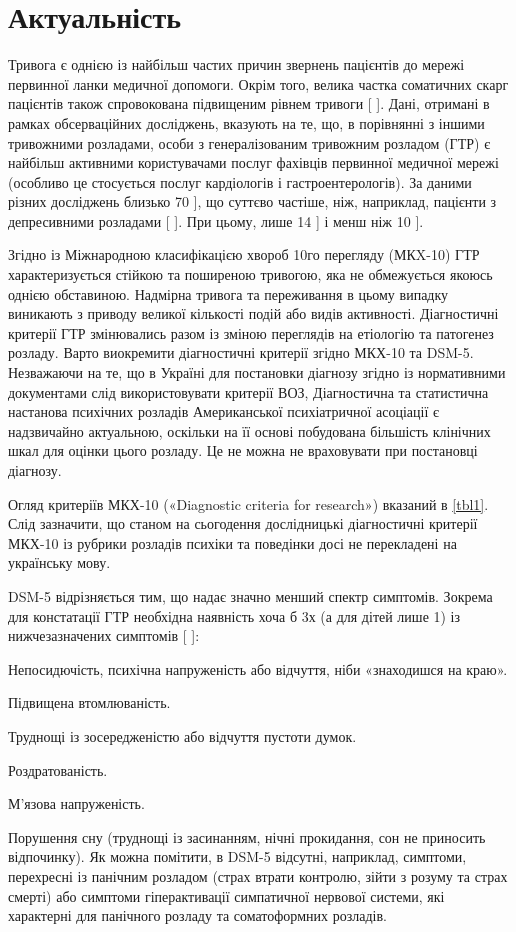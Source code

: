 \section {Актуальність}
Тривога є однією із найбільш частих причин звернень пацієнтів до мережі первинної ланки медичної допомоги. Окрім того, велика частка соматичних скарг пацієнтів також спровокована підвищеним рівнем тривоги [
\cite{bib1}]. Дані, отримані в рамках обсерваційних досліджень, вказують на те, що, в порівнянні з іншими тривожними розладами, особи з генералізованим тривожним розладом (ГТР) є найбільш активними користувачами послуг фахівців первинної медичної мережі (особливо це стосується послуг кардіологів і гастроентерологів). За даними різних досліджень близько 70%
\cite{bib2}], що суттєво частіше, ніж, наприклад, пацієнти з депресивними розладами [
\cite{bib3}]. При цьому, лише 14%
\cite{bib4}] і менш ніж 10%
\cite{bib3}].

Згідно із Міжнародною класифікацією хвороб 10го перегляду (МКX-10) ГТР характеризується стійкою та поширеною тривогою, яка не обмежується якоюсь однією обставиною. Надмірна тривога та переживання в цьому випадку виникають з приводу великої кількості подій або видів активності. Діагностичні критерії ГТР змінювались разом із зміною переглядів на етіологію та патогенез розладу. Варто виокремити діагностичні критерії згідно МКХ-10 та DSM-5. Незважаючи на те, що в Україні для постановки діагнозу згідно із нормативними документами слід використовувати критерії ВОЗ, Діагностична та статистична настанова психічних розладів Американської психіатричної асоціації є надзвичайно актуальною, оскільки на її основі побудована більшість клінічних шкал для оцінки цього розладу. Це не можна не враховувати при постановці діагнозу.

Огляд критеріїв МКХ-10 («Diagnostic criteria for research») вказаний в 
\ref{tbl1}. Слід зазначити, що станом на сьогодення дослідницькі діагностичні критерії МКХ-10 із рубрики розладів психіки та поведінки досі не перекладені на українську мову.

DSM-5 відрізняється тим, що надає значно менший спектр симптомів. Зокрема для констатації ГТР необхідна наявність хоча б 3х (а для дітей лише 1) із нижчезазначених симптомів [
\cite{bib6}]:

\item Непосидючість, психічна напруженість або відчуття, ніби «знаходишся на краю».
\item Підвищена втомлюваність.
\item Труднощі із зосередженістю або відчуття пустоти думок.
\item Роздратованість.
\item М’язова напруженість.
\item Порушення сну (труднощі із засинанням, нічні прокидання, сон не приносить відпочинку).
Як можна помітити, в DSM-5 відсутні, наприклад, симптоми, перехресні із панічним розладом (страх втрати контролю, зійти з розуму та страх смерті) або симптоми гіперактивації симпатичної нервової системи, які характерні для панічного розладу та соматоформних розладів.

